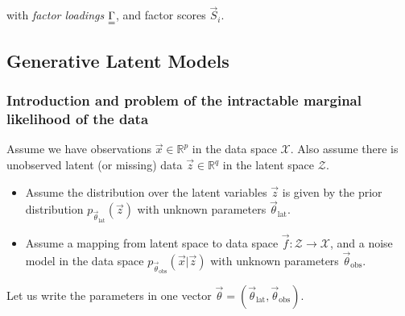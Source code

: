 with \textit{factor loadings} $\mat{\Gamma}$, and factor scores $\vec{S}_i$.



\subsection{Generative Latent Models}
\subsubsection{Introduction and problem of the intractable marginal likelihood of the data}
Assume we have observations $\vec{x} \in \mathbb{R}^p$ in the data space $\mathcal{X}$. 
Also assume there is unobserved latent (or missing) 
data $\vec{z} \in \mathbb{R}^q$ in the latent space $\mathcal{Z}$.

\begin{itemize}
    \item Assume the distribution over the latent variables $\vec{z}$ is given
    by the prior distribution $p_{\vec{\theta}_{\text{lat}}}(\vec{z})$ with unknown parameters
    $\vec{\theta}_{\text{lat}}$.
    \item Assume a mapping from latent space to data space $\vec{f}: \mathcal{Z} \rightarrow \mathcal{X}$,
    and a noise model in the data space $p_{\vec{\theta}_{\text{obs}}}(\vec{x} | \vec{z})$ with unknown parameters
    $\vec{\theta}_{\text{obs}}$.
\end{itemize}

Let us write the parameters in one vector $\vec{\theta} = (\vec{\theta}_{\text{lat}}, \vec{\theta}_{\text{obs}})$.


